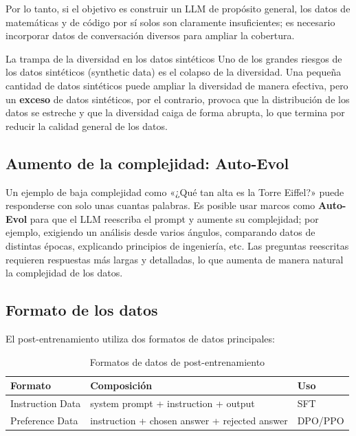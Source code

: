 \documentclass[a4paper]{article}
\begin{document}
Por lo tanto, si el objetivo es construir un LLM de propósito general, los datos de matemáticas y de código por sí solos son claramente insuficientes; es necesario incorporar datos de conversación diversos para ampliar la cobertura.

\begin{warningbox}{La trampa de la diversidad en los datos sintéticos}
Uno de los grandes riesgos de los datos sintéticos (synthetic data) es el colapso de la diversidad. Una pequeña cantidad de datos sintéticos puede ampliar la diversidad de manera efectiva, pero un \textbf{exceso} de datos sintéticos, por el contrario, provoca que la distribución de los datos se estreche y que la diversidad caiga de forma abrupta, lo que termina por reducir la calidad general de los datos.
\end{warningbox}

\subsection{Aumento de la complejidad: Auto-Evol}

Un ejemplo de baja complejidad como «¿Qué tan alta es la Torre Eiffel?» puede responderse con solo unas cuantas palabras. Es posible usar marcos como \textbf{Auto-Evol} para que el LLM reescriba el prompt y aumente su complejidad; por ejemplo, exigiendo un análisis desde varios ángulos, comparando datos de distintas épocas, explicando principios de ingeniería, etc. Las preguntas reescritas requieren respuestas más largas y detalladas, lo que aumenta de manera natural la complejidad de los datos.

\subsection{Formato de los datos}

El post-entrenamiento utiliza dos formatos de datos principales:

\begin{table}[H]
\centering
\caption{Formatos de datos de post-entrenamiento}
\begin{tabular}{lll}
\toprule
\textbf{Formato} & \textbf{Composición} & \textbf{Uso} \\
\midrule
Instruction Data & system prompt + instruction + output & SFT \\
Preference Data & instruction + chosen answer + rejected answer & DPO/PPO \\
\bottomrule
\end{tabular}
\end{table}
\end{document}
